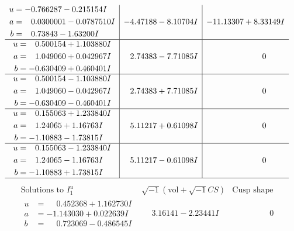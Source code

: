 \documentclass[1p]{elsarticle_modified}
\theoremstyle{definition}
\newcommand{\I}{\sqrt{-1}}
\begin{document}
$$\begin{array}{c|c|c}
\begin{aligned}
u &= -0.766287 - 0.215154 I \\
a &= \phantom{-}0.0300001 - 0.0787510 I \\
b &= \phantom{-}0.73843 - 1.63200 I\end{aligned}
 & -4.47188 - 8.10704 I & -11.13307 + 8.33149 I \\ \hline\begin{aligned}
u &= \phantom{-}0.500154 + 1.103880 I \\
a &= \phantom{-}1.049060 + 0.042967 I \\
b &= -0.630409 + 0.460401 I\end{aligned}
 & \phantom{-}2.74383 - 7.71085 I & \phantom{-0.000000 } 0 \\ \hline\begin{aligned}
u &= \phantom{-}0.500154 - 1.103880 I \\
a &= \phantom{-}1.049060 - 0.042967 I \\
b &= -0.630409 - 0.460401 I\end{aligned}
 & \phantom{-}2.74383 + 7.71085 I & \phantom{-0.000000 } 0 \\ \hline\begin{aligned}
u &= \phantom{-}0.155063 + 1.233840 I \\
a &= \phantom{-}1.24065 + 1.16763 I \\
b &= -1.10883 - 1.73815 I\end{aligned}
 & \phantom{-}5.11217 + 0.61098 I & \phantom{-0.000000 } 0 \\ \hline\begin{aligned}
u &= \phantom{-}0.155063 - 1.233840 I \\
a &= \phantom{-}1.24065 - 1.16763 I \\
b &= -1.10883 + 1.73815 I\end{aligned}
 & \phantom{-}5.11217 - 0.61098 I & \phantom{-0.000000 } 0\\
 \hline 
 \end{array}$$\newpage$$\begin{array}{c|c|c}  
\text{Solutions to }I^u_{1}& \I (\text{vol} + \sqrt{-1}CS) & \text{Cusp shape}\\
 \hline 
\begin{aligned}
u &= \phantom{-}0.452368 + 1.162730 I \\
a &= -1.143030 + 0.022639 I \\
b &= \phantom{-}0.723069 - 0.486545 I\end{aligned}
 & \phantom{-}3.16141 - 2.23441 I & \phantom{-0.000000 } 0 \\ \hline\begin{aligned}

\end{aligned}
\end{array}$$
\end{document}
